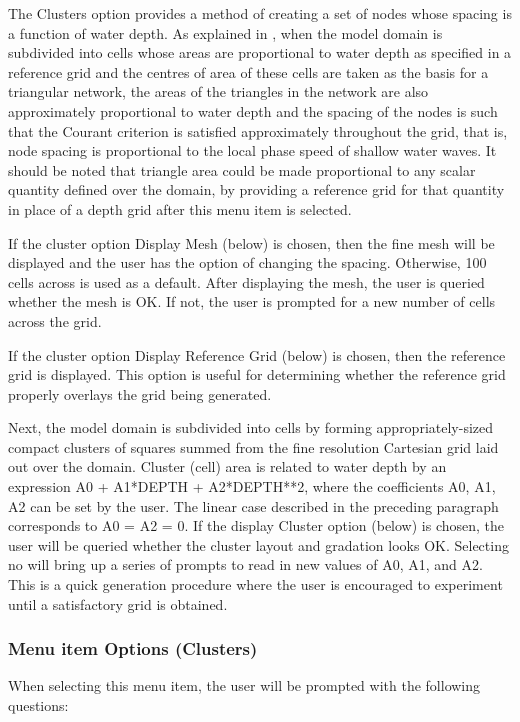 \documentclass{article}
\begin{document}
The Clusters option provides a method of creating a set of nodes whose spacing is a function of water depth. As explained in \cite{HW1992}, when the model domain is subdivided into cells whose areas are proportional to water depth as specified in a reference grid and the centres of area of these cells are taken as the basis for a triangular network, the areas of the triangles in the network are also approximately proportional to water depth and the spacing of the nodes is such that the Courant criterion is satisfied approximately throughout the grid, that is, node spacing is proportional to the local phase speed of shallow water waves. It should be noted that triangle area could be made proportional to any scalar quantity defined over the domain, by providing a reference grid for that quantity in place of a depth grid after this menu item is selected.

If the cluster option Display Mesh (below) is chosen, then the fine mesh will be displayed and the user has the option of changing the spacing. Otherwise, 100 cells across is used as a default. After displaying the mesh, the user is queried whether the mesh is OK. If not, the user is prompted for a new number of cells across the grid.

If the cluster option Display Reference Grid (below) is chosen, then the reference grid is displayed. This option is useful for determining whether the reference grid properly overlays the grid being generated.

Next, the model domain is subdivided into cells by forming appropriately-sized compact clusters of squares summed from the fine resolution Cartesian grid laid out over the domain. Cluster (cell) area is related to water depth by an expression A0 + A1*DEPTH + A2*DEPTH**2, where the coefficients A0, A1, A2 can be set by the user. The linear case described in the preceding paragraph corresponds to A0 = A2 = 0. If the display Cluster option (below) is chosen, the user will be queried whether the cluster layout and gradation looks OK. Selecting no will bring up a series of prompts to read in new values of A0, A1, and A2. This is a quick generation procedure where the user is encouraged to experiment until a satisfactory grid is obtained.

\subsubsection[Menu item Options]{Menu item Options (Clusters)}

When selecting this menu item, the user will be prompted with the following questions:\\
\end{document}
